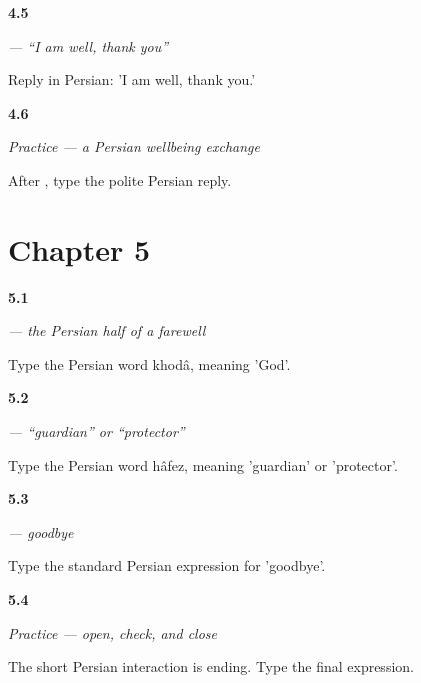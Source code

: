 \noindent\begin{minipage}[t]{\linewidth}
\raggedright
\hypertarget{review-FA-C04-khubam-reply}{\textbf{4.5}} \emph{  — “I am well, thank you”}\par
\small Reply in Persian: 'I am well, thank you.'
\end{minipage}\par\medskip

\noindent\begin{minipage}[t]{\linewidth}
\raggedright
\hypertarget{review-FA-C04-practice-next-line}{\textbf{4.6}} \emph{Practice — a Persian wellbeing exchange}\par
\small After    , type the polite Persian reply.
\end{minipage}\par\medskip

\section*{Chapter 5}

\noindent\begin{minipage}[t]{\linewidth}
\raggedright
\hypertarget{review-FA-C05-khoda-meaning}{\textbf{5.1}} \emph{ — the Persian half of a farewell}\par
\small Type the Persian word khodâ, meaning 'God'.
\end{minipage}\par\medskip

\noindent\begin{minipage}[t]{\linewidth}
\raggedright
\hypertarget{review-FA-C05-hafez-meaning}{\textbf{5.2}} \emph{ — “guardian” or “protector”}\par
\small Type the Persian word hâfez, meaning 'guardian' or 'protector'.
\end{minipage}\par\medskip

\noindent\begin{minipage}[t]{\linewidth}
\raggedright
\hypertarget{review-FA-C05-khodahafez-goodbye}{\textbf{5.3}} \emph{ — goodbye}\par
\small Type the standard Persian expression for 'goodbye'.
\end{minipage}\par\medskip

\noindent\begin{minipage}[t]{\linewidth}
\raggedright
\hypertarget{review-FA-C05-practice-final-line}{\textbf{5.4}} \emph{Practice — open, check, and close}\par
\small The short Persian interaction is ending. Type the final expression.
\end{minipage}\par\medskip

